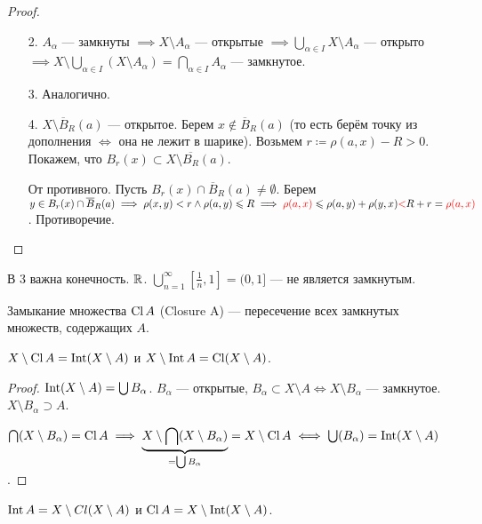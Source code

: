 \begin{proof}
    \begin{enumerate}
        \item[2.] $A_\alpha$ --- замкнуты  $\implies X \setminus A_\alpha$ --- открытые  $\implies \bigcup\limits_{\alpha \in I} X \setminus A_\alpha$ --- открыто  $\implies X \setminus  \bigcup\limits_{\alpha \in I} (X \setminus A_{\alpha}) = \bigcap\limits_{\alpha \in I} A_\alpha$ --- замкнутое.
        \item[3.] Аналогично.
        \item[4.] $X \setminus \overline{B}_R(a)$ --- открытое. Берем  $x \notin \overline{B}_R(a)$ (то есть берём точку из дополнения $\iff$ она не лежит в шарике). Возьмем $r \coloneqq \rho(a, x) - R > 0$. Покажем, что  $B_r(x) \subset X \setminus \overline{B_R}(a)$.

            От противного. Пусть $B_r(x) \cap \overline{B}_R(a) \neq \emptyset$. Берем  $y \in B_r(x) \cap \overline{B}_R(a) \implies \rho(x, y) < r \land \rho(a, y) \le R \implies {\color{red}{\rho(a, x)}} \le \rho(a, y) + \rho(y, x) {\color{red}{<}} R + r = {\color{red}{\rho(a, x)}}$. Противоречие.
    \end{enumerate}
\end{proof}
\begin{remark}
    В 3 важна конечность. $\R$.  $\bigcup\limits_{n=1}^{\infty} [\frac{1}{n}, 1] = (0, 1]$ --- не является замкнутым.
\end{remark}
\begin{definition}
    Замыкание множества $\Cl A$ (Closure A) --- пересечение всех замкнутых множеств, содержащих  $A$.
\end{definition}
\begin{theorem}
    $X \setminus \Cl A = \Int(X \setminus A)$ и  $X \setminus \Int A = \Cl(X \setminus A)$.
\end{theorem}
\begin{proof}
    $\Int(X \setminus A) = \bigcup B_{\alpha}$.  $B_\alpha$ --- открытые,  $B_\alpha \subset X \setminus A \iff X \setminus B_\alpha$ --- замкнутое. $X \setminus B_\alpha \supset A$.

    $\bigcap(X \setminus B_\alpha) = \Cl A \implies \underbrace{X \setminus \bigcap (X \setminus B_\alpha)}_{=\bigcup B_{\alpha}} = X \setminus \Cl A \iff \bigcup(B_\alpha) = \Int(X \setminus A)$.
\end{proof}
\begin{consequence}
    $\Int A = X \setminus Cl(X \setminus A)$ и  $\Cl A = X \setminus \Int(X \setminus A)$.
\end{consequence}

